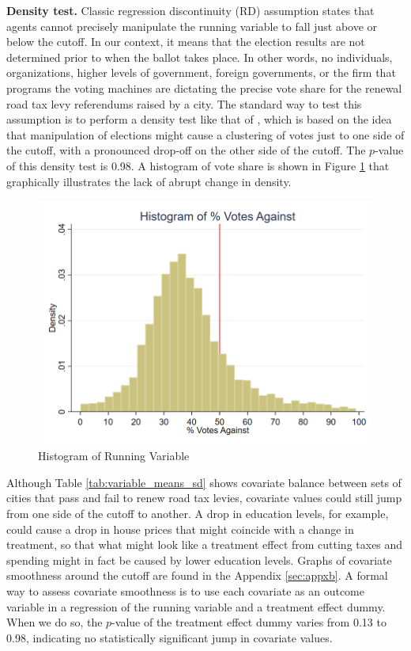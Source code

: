 {\bf Density test.} Classic regression discontinuity (RD) assumption states that agents cannot precisely manipulate the running variable to fall just above or below the cutoff. In our context, it means that the election results are not determined prior to when the ballot takes place. In other words, no individuals, organizations, higher levels of government, foreign governments, or the firm that programs the voting machines are dictating the precise vote share for the renewal road tax levy referendums raised by a city. The standard way to test this assumption is to perform a density test like that of \cite{cattaneo2020simple}, which is based on the idea that manipulation of elections might cause a clustering of votes just to one side of the cutoff, with a pronounced drop-off on the other side of the cutoff. The $p$-value of this density test is 0.98. A histogram of vote share is shown in Figure \ref{fig:running_var_hist} that graphically illustrates the lack of abrupt change in density.

\begin{figure}[ht]
    \centering
    \includegraphics[width=\textwidth,keepaspectratio]{images/votes_pct_against_histogram.png}
    \caption{Histogram of Running Variable}
    \label{fig:running_var_hist}
\end{figure}

Although Table \ref{tab:variable_means_sd} shows covariate balance between sets of cities that pass and fail to renew road tax levies, covariate values could still jump from one side of the cutoff to another. A drop in education levels, for example, could cause a drop in house prices that might coincide with a change in treatment, so that what might look like a treatment effect from cutting taxes and spending might in fact be caused by lower education levels. Graphs of covariate smoothness around the cutoff are found in the Appendix \ref{sec:appxb}. A formal way to assess covariate smoothness is to use each covariate as an outcome variable in a regression of the running variable and a treatment effect dummy. When we do so, the $p$-value of the treatment effect dummy varies from 0.13 to 0.98, indicating no statistically significant jump in covariate values. 

